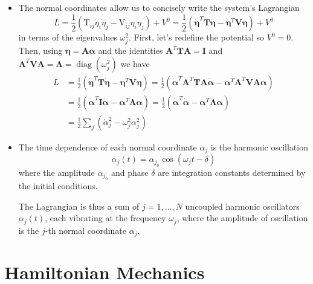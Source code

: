 \documentclass[11pt, a4paper]{article}
\newcommand{\bdot}[1]{\dot{\bm{#1}}}
\newcommand{\mat}[1]{\mathbf{#1}}
\begin{document}
\begin{itemize}
	\item The normal coordinates allow us to concisely write the system's Lagrangian
	\begin{equation*}
		L = \frac{1}{2} \left( \mathrm{T}_{ij}\dot{\eta}_{i}\dot{\eta}_{j} - \mathrm{V}_{ij}\eta_{i}\eta_{j} \right) + V^{0} =  \frac{1}{2}\left(\bdot{\eta}^{T} \mat{T} \bdot{\eta} - \bm{\eta}^{T} \mat{V} \bm{\eta}\right) + V^{0}
	\end{equation*}
	in terms of the eigenvalues $ \omega_{j}^{2} $. First, let's redefine the potential so $ V^{0} = 0$. Then, using $ \bm{\eta} = \mat{A} \bm{\alpha}  $ and the identities $ \mat{A}^{T} \mat{T} \mat{A} = \mat{I} $ and $  \mat{A}^{T} \mat{V} \mat{A} = \mat{\Lambda} = \operatorname{diag}(\omega_{j}^{2}) $ we have
	\begin{align*}
		L &= \frac{1}{2}\left(\bdot{\eta}^{T} \mat{T} \bdot{\eta} - \bm{\eta}^{T} \mat{V} \bm{\eta}\right) = \frac{1}{2} \left( \bdot{\alpha}^{T} \mat{A}^{T} \mat{T} \mat{A} \bdot{\alpha} - \bm{\alpha}^{T} \mat{A}^{T} \mat{V} \mat{A} \bm{\alpha} \right)\\
		&=\frac{1}{2}\left(\bdot{\alpha}^{T} \mat{I} \bdot{\alpha} - \bm{\alpha}^{T} \mat{\Lambda} \bm{\alpha}\right) =\frac{1}{2}\left(\bdot{\alpha}^{T} \bdot{\alpha} - \bm{\alpha}^{T} \mat{\Lambda} \bm{\alpha}\right)\\
		&=\frac{1}{2}\sum_{j}\left(\dot{\alpha}_{j}^{2} - \omega_{j}^{2} \alpha_{j}^{2} \right)
	\end{align*}
	
	\item The time dependence of each normal coordinate $ \alpha_{j} $ is the harmonic oscillation
	\begin{equation*}
		\alpha_{j}(t) = \alpha_{j_{0}} \cos(\omega_{j}t - \delta)
	\end{equation*}
	where the amplitude $ \alpha_{j_{0}} $ and phase $ \delta $ are integration constants determined by the initial conditions.
	
	The Lagrangian is thus a sum of $ j = 1, \ldots, N$ uncoupled harmonic oscillators $ \alpha_{j}(t) $, each vibrating at the frequency $ \omega_{j} $, where the amplitude of oscillation is the $ j $-th normal coordinate $ \alpha_{j} $. 
	

\end{itemize}

\section{Hamiltonian Mechanics}
\end{document}
